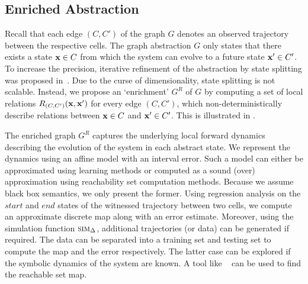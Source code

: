 


\subsection{Enriched Abstraction}



Recall that each edge $(C,C')$ of the graph $G$ denotes an observed
trajectory between the respective cells. The graph abstraction $G$
only states that there exists a state $\mathbf{x} \in C$ from which the system
can evolve to a future state $\mathbf{x}' \in C'$. To increase the precision,
iterative refinement of the abstraction by state splitting was
proposed in~\cite{zutshi2014multiple}. Due to the curse of
dimensionality, state splitting is not scalable. Instead, we propose
an `enrichment' $G^R$ of $G$ by computing a set of local relations
$R_{(C,C')}(\mathbf{x},\mathbf{x}')$ for every edge $(C,C')$, which
non-deterministically describe relations between $\mathbf{x} \in C$ and $\mathbf{x}'
\in C'$. This is illustrated in .

The enriched graph $G^R$ captures the underlying local forward
dynamics describing the evolution of the system in each abstract
state. We represent the dynamics using an affine model with an
interval error. Such a model can either be approximated using learning
methods or computed as a sound (over) approximation using reachability
set computation methods. Because we assume black box semantics, we
only present the former. Using regression analysis on the $start$ and
$end$ states of the witnessed trajectory between two cells,
we compute an approximate discrete map along with an error estimate.
Moreover, using the simulation function $\mbox{\sc sim}_\Delta$, additional
trajectories (or data) can be generated if required. The data
can be separated into a training set and testing set to compute the
map and the error respectively.  The latter case can be explored if
the symbolic dynamics of the system are known. A tool like
\flowstar~\cite{chen2013flow} can be used to find the reachable set
map.

